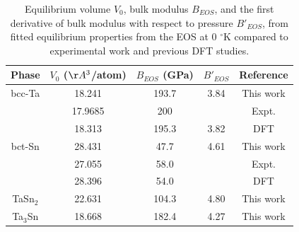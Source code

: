 \newpage
\begin{table}[H]
	\caption{Equilibrium volume $V_{0}$, bulk modulus $B_{EOS}$, and the first derivative of bulk modulus with respect to pressure $B'_{EOS}$, from fitted equilibrium properties from the EOS at 0 $^\circ$K compared to experimental work and previous DFT studies.}
	\centering
	\begin{tabular}{ c c c c c }
		\hline
		Phase & $V_{0}$ ($\AA^3$/atom) & $B_{EOS}$ (GPa) & $B'_{EOS}$ & Reference\\
		\hline
		bcc-Ta & 18.241 & 193.7 & 3.84 & This work\\
		            & 17.9685 & 200 &  & Expt. \cite{Predmore1970}\\
		            & 18.313 & 195.3 & 3.82 & DFT \cite{Shang2010b}\\
	    bct-Sn & 28.431 & 47.7 & 4.61 & This work\\
	               & 27.055 & 58.0 & & Expt. \cite{PeltzeryBlanca1993a}\\
	               & 28.396 & 54.0 & & DFT \cite{PeltzeryBlanca1993a}\\
	 TaSn$_2$ & 22.631 & 104.3 & 4.80 & This work\\
	 Ta$_3$Sn & 18.668 & 182.4 & 4.27 & This work\\
		\hline
	\end{tabular}
	\label{Ch4-table:TaSnvolume}
\end{table}
\clearpage

